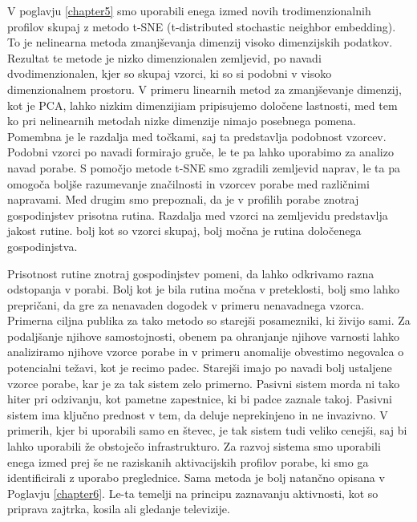 \begin{sloabstract}
V poglavju \ref{chapter5} smo uporabili enega izmed novih trodimenzionalnih profilov skupaj z metodo t-SNE (t-distributed stochastic neighbor embedding). To je nelinearna metoda zmanjševanja dimenzij visoko dimenzijskih podatkov. Rezultat te metode je nizko dimenzionalen zemljevid, po navadi dvodimenzionalen, kjer so skupaj vzorci, ki so si podobni v visoko dimenzionalnem prostoru. V primeru linearnih metod za zmanjševanje dimenzij, kot je PCA, lahko nizkim dimenzijiam pripisujemo določene lastnosti, med tem ko pri nelinearnih metodah nizke dimenzije nimajo posebnega pomena. Pomembna je le razdalja med točkami, saj ta predstavlja podobnost vzorcev. Podobni vzorci po navadi formirajo gruče, le te pa lahko uporabimo za analizo navad porabe. S pomočjo metode t-SNE smo zgradili zemljevid naprav, le ta pa omogoča boljše razumevanje značilnosti in vzorcev porabe med različnimi napravami. Med drugim smo prepoznali, da je v profilih porabe znotraj gospodinjstev prisotna rutina. Razdalja med vzorci na zemljevidu predstavlja jakost rutine. bolj kot so vzorci skupaj, bolj močna je rutina določenega gospodinjstva. 

Prisotnost rutine znotraj gospodinjstev pomeni, da lahko odkrivamo razna odstopanja v porabi. Bolj kot je bila rutina močna v preteklosti, bolj smo lahko prepričani, da gre za nenavaden dogodek v primeru nenavadnega vzorca. Primerna ciljna publika za tako metodo so starejši posamezniki, ki živijo sami. Za podaljšanje njihove samostojnosti, obenem pa ohranjanje njihove varnosti lahko analiziramo njihove vzorce porabe in v primeru anomalije obvestimo negovalca o potencialni težavi, kot je recimo padec. Starejši imajo po navadi bolj ustaljene vzorce porabe, kar je za tak sistem zelo primerno. Pasivni sistem morda ni tako hiter pri odzivanju, kot pametne zapestnice, ki bi padce zaznale takoj. Pasivni sistem ima ključno prednost v tem, da deluje neprekinjeno in ne invazivno. V primerih, kjer bi uporabili samo en števec, je tak sistem tudi veliko cenejši, saj bi lahko uporabili že obstoječo infrastrukturo. Za razvoj sistema smo uporabili enega izmed prej še ne raziskanih aktivacijskih profilov porabe, ki smo ga identificirali z uporabo preglednice. Sama metoda je bolj natančno opisana v Poglavju \ref{chapter6}. Le-ta temelji na principu zaznavanju aktivnosti, kot so priprava zajtrka, kosila ali gledanje televizije.  


\end{sloabstract}
